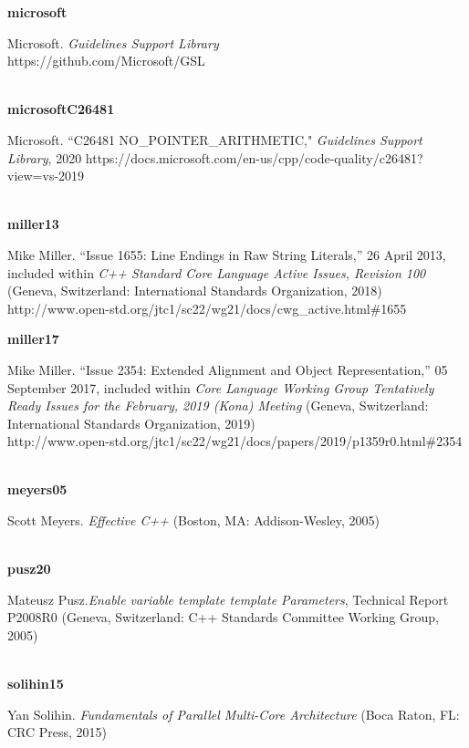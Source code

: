 \noindent\textbf{microsoft}\\
\hspace*{2em}\parbox[t]{\textwidth}{Microsoft. \textit{Guidelines Support Library}\\
https://github.com/Microsoft/GSL}\\

\noindent\textbf{microsoftC26481}\\
\hspace*{2em}\parbox[t]{\textwidth}{Microsoft. ``C26481 NO\_POINTER\_ARITHMETIC," \textit{Guidelines Support Library}, 2020
https://docs.microsoft.com/en-us/cpp/code-quality/c26481?view=vs-2019}\\

\noindent\textbf{miller13}\\
\hspace*{2em}\parbox[t]{\textwidth}{Mike Miller. ``Issue 1655: Line Endings in Raw String Literals,” 26 April 2013, included within \textit{C++ Standard Core Language Active Issues, Revision 100} (Geneva, Switzerland: International Standards Organization, 2018)\\
http://www.open-std.org/jtc1/sc22/wg21/docs/cwg\_active.html\#1655}

\noindent\textbf{miller17}\\
\hspace*{2em}\parbox[t]{\textwidth}{Mike Miller. ``Issue 2354: Extended Alignment and Object Representation,” 05 September 2017, included within \textit{Core Language Working Group Tentatively Ready Issues for the February, 2019 (Kona) Meeting} (Geneva, Switzerland: International Standards Organization, 2019)\\
http://www.open-std.org/jtc1/sc22/wg21/docs/papers/2019/p1359r0.html\#2354}\\

\noindent\textbf{meyers05}\\
\hspace*{2em}\parbox[t]{\textwidth}{Scott Meyers. \textit{Effective C++} (Boston, MA: Addison-Wesley, 2005)}\\

\noindent\textbf{pusz20}\\
\hspace*{2em}\parbox[t]{\textwidth}{Mateusz Pusz.\textit{Enable variable template template Parameters}, Technical Report P2008R0 (Geneva, Switzerland: C++ Standards Committee Working Group, 2005)}\\

\noindent\textbf{solihin15}\\
\hspace*{2em}\parbox[t]{\textwidth}{Yan Solihin. \textit{Fundamentals of Parallel Multi-Core Architecture} (Boca Raton, FL: CRC Press, 2015)}\\

